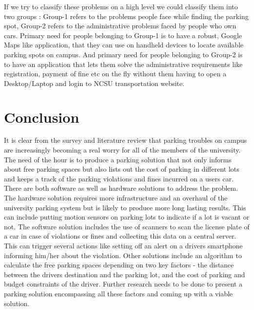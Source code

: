 \documentclass{acm_proc_article-sp}
\begin{document}
If we try to classify these problems on a high level we could classify them into two groups : Group-1 refers to the problems people face while finding the parking spot, Group-2 refers to the administrative problems faced by people who own cars. Primary need for people belonging to Group-1 is to have a robust, Google Maps like application, that they can use on handheld devices to locate available parking spots on campus. And primary need for people belonging to Group-2 is to have an application that lets them solve the administrative requirements like registration, payment of fine etc on the fly without them having to open a Desktop/Laptop and login to NCSU transportation website.


\section{Conclusion}
It is clear from the survey and literature review that parking troubles on campus are increasingly becoming a real worry for all of the members of the university. The need of the hour is to produce a parking solution that not only informs about free parking spaces but also lists out the cost of parking in different lots and keeps a track of the parking violations and fines incurred on a user\textsc{}s car. There are both software as well as hardware solutions to address the problem. The hardware solution requires more infrastructure and an overhaul of the university parking system but is likely to produce more long lasting results. This can include putting motion sensors on parking lots to indicate if a lot is vacant or not. The software solution includes the use of scanners to scan the license plate of a car in case of violations or fines and collecting this data on a central server. This can trigger several actions like setting off an alert on a driver\textsc{}s smartphone informing him/her about the violation. Other solutions include an algorithm to calculate the free parking spaces depending on two key factors - the distance between the driver\textsc{}s destination and the parking lot, and the cost of parking and budget constraints of the driver. Further research needs to be done to present a parking solution encompassing all these factors and coming up with a viable solution.
\end{document}
